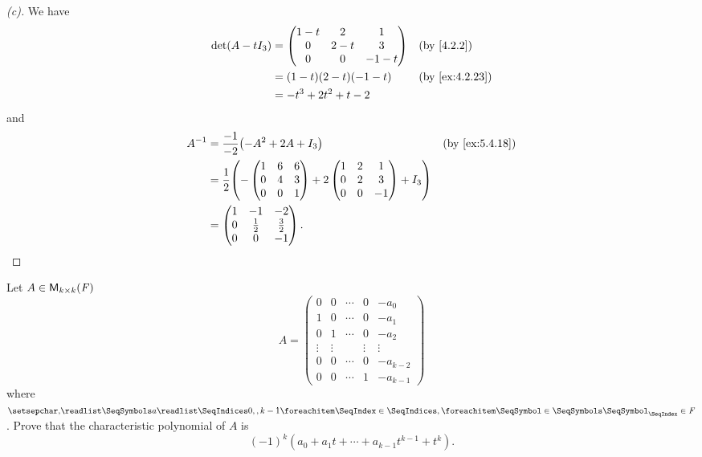 \begin{proof}[(c)]
	We have
	\begin{align*}
		\det(A - t I_3) & = \begin{pmatrix}
			                    1 - t & 2     & 1      \\
			                    0     & 2 - t & 3      \\
			                    0     & 0     & -1 - t
		                    \end{pmatrix} &  & \by{4.2.2}               \\
		                & = (1 - t)(2 - t)(-1 - t)  &  & \by{ex:4.2.23} \\
		                & = -t^3 + 2t^2 + t - 2
	\end{align*}
	and
	\begin{align*}
		A^{-1} & = \frac{-1}{-2} \pa{-A^2 + 2A + I_3} &  & \by{ex:5.4.18} \\
		       & = \frac{1}{2} \pa{-\begin{pmatrix}
				                            1 & 6 & 6 \\
				                            0 & 4 & 3 \\
				                            0 & 0 & 1
			                            \end{pmatrix} + 2\begin{pmatrix}
				                                             1 & 2 & 1  \\
				                                             0 & 2 & 3  \\
				                                             0 & 0 & -1
			                                             \end{pmatrix} + I_3} \\
		       & = \begin{pmatrix}
			           1 & -1          & -2          \\
			           0 & \frac{1}{2} & \frac{3}{2} \\
			           0 & 0           & -1
		           \end{pmatrix}.
	\end{align*}
\end{proof}

\begin{ex}\label{ex:5.4.19}
	Let \(A \in \ms[k][k][\F]\)
	\[
		A = \begin{pmatrix}
			0      & 0      & \cdots & 0      & -a_0       \\
			1      & 0      & \cdots & 0      & -a_1       \\
			0      & 1      & \cdots & 0      & -a_2       \\
			\vdots & \vdots &        & \vdots & \vdots     \\
			0      & 0      & \cdots & 0      & -a_{k - 2} \\
			0      & 0      & \cdots & 1      & -a_{k - 1}
		\end{pmatrix}
	\]
	where \(\seq{a}{0,,k-1} \in \F\).
	Prove that the characteristic polynomial of \(A\) is
	\[
		(-1)^k (a_0 + a_1 t + \cdots + a_{k - 1} t^{k - 1} + t^k).
	\]
\end{ex}

